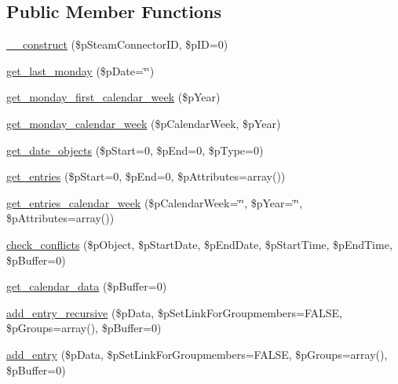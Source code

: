\subsection*{Public Member Functions}
\begin{DoxyCompactItemize}
\item 
\hyperlink{classsteam__calendar_acada3697f2491360e4c8ce9ff8da80bd}{\_\-\_\-construct} (\$pSteamConnectorID, \$pID=0)
\item 
\hyperlink{classsteam__calendar_ad19c281650ef23346a75e61b225d1bd4}{get\_\-last\_\-monday} (\$pDate=\char`\"{}\char`\"{})
\item 
\hyperlink{classsteam__calendar_a9e14982bfe26a1179752e6b440584b3e}{get\_\-monday\_\-first\_\-calendar\_\-week} (\$pYear)
\item 
\hyperlink{classsteam__calendar_aeffbb2473207b5555659a2f69530ad78}{get\_\-monday\_\-calendar\_\-week} (\$pCalendarWeek, \$pYear)
\item 
\hyperlink{classsteam__calendar_a04c03d9fdeb477cd5fe97425b9a0876f}{get\_\-date\_\-objects} (\$pStart=0, \$pEnd=0, \$pType=0)
\item 
\hyperlink{classsteam__calendar_ae1d353e141d476fdce2e4d0d285d641c}{get\_\-entries} (\$pStart=0, \$pEnd=0, \$pAttributes=array())
\item 
\hyperlink{classsteam__calendar_aa2dba879f6d933ab34e7bb9051f19449}{get\_\-entries\_\-calendar\_\-week} (\$pCalendarWeek=\char`\"{}\char`\"{}, \$pYear=\char`\"{}\char`\"{}, \$pAttributes=array())
\item 
\hyperlink{classsteam__calendar_a79c7f908c1d6e89a67b53d0328b421bb}{check\_\-conflicts} (\$pObject, \$pStartDate, \$pEndDate, \$pStartTime, \$pEndTime, \$pBuffer=0)
\item 
\hyperlink{classsteam__calendar_a3f495ac1b855805782af23fd0e1c62e1}{get\_\-calendar\_\-data} (\$pBuffer=0)
\item 
\hyperlink{classsteam__calendar_aa54a57afcca288b1cbfc7e867bd61c31}{add\_\-entry\_\-recursive} (\$pData, \$pSetLinkForGroupmembers=FALSE, \$pGroups=array(), \$pBuffer=0)
\item 
\hyperlink{classsteam__calendar_a08d7cd04e8dfe5a355aa88b1a9701d0c}{add\_\-entry} (\$pData, \$pSetLinkForGroupmembers=FALSE, \$pGroups=array(), \$pBuffer=0)
\end{DoxyCompactItemize}


